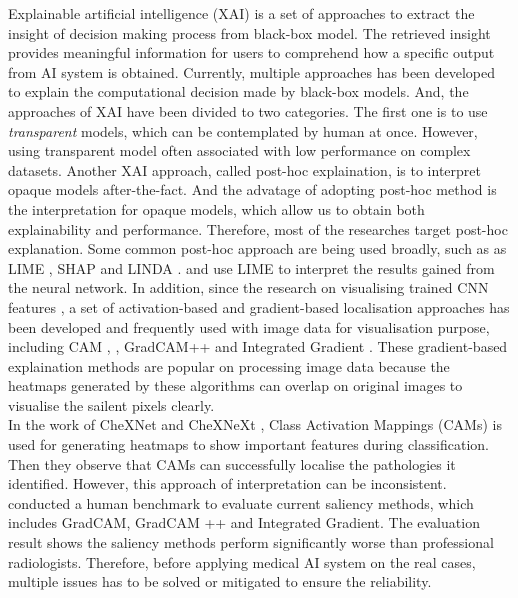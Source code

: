 Explainable artificial intelligence (XAI) is a set of approaches to extract the insight of decision making process from black-box model. The retrieved insight provides meaningful information for users to comprehend how a specific output from AI system is obtained. Currently, multiple approaches has been developed to explain the computational decision made by black-box models. And, the approaches of XAI have been divided to two categories. The first one is to use \textit{transparent} models, which can be contemplated by human at once. However, using transparent model often associated with low performance on complex datasets. Another XAI approach, called post-hoc explaination, is to interpret opaque models after-the-fact. And the advatage of adopting post-hoc method is the interpretation for opaque models, which allow us to obtain both explainability and performance. Therefore, most of the researches target post-hoc explanation. Some common post-hoc approach are being used broadly, such as as LIME \citep{Ribeiro2016LIME}, SHAP \citep{Lundberg2017SHAP} and LINDA \citep{Moreira2021LINDA}. \citet{Ahsan2020LIMEOnCXR} and \citet{Teixeira2021LIMEAndGradCAMOnCXR} use LIME to interpret the results gained from the neural network. In addition, since the research on visualising trained CNN features \citep{Zeiler2014UnderstandCNN} \citep{Simonyan14DeepInside}, a set of activation-based and gradient-based localisation approaches has been developed and frequently used with image data for visualisation purpose, including CAM \citep{Zhou2015CAM}, \citep{Selvaraju2017GradCAM}, GradCAM++ \citep{Chattopadhay2018GradCAM++} and Integrated Gradient \citep{Sundararajan2017IntegratedGradient}. These gradient-based explaination methods are popular on processing image data because the heatmaps generated by these algorithms can overlap on original images to visualise the sailent pixels clearly. \\


In the work of CheXNet \citep{Rajpurkar2017CheXNet} and CheXNeXt \citep{Rajpurkar2018CheXNeXt}, Class Activation Mappings (CAMs) \citep{Zhou2015CAM} is used for generating heatmaps to show important features during classification. Then they observe that CAMs can successfully localise the pathologies it identified. However, this approach of interpretation can be inconsistent. \citet{Saporta2021BechmarkingSaliencyMethods} conducted a human benchmark to evaluate current saliency methods, which includes GradCAM, GradCAM ++ and Integrated Gradient. The evaluation result shows the saliency methods perform significantly worse than professional radiologists. Therefore, before applying medical AI system on the real cases, multiple issues has to be solved or mitigated to ensure the reliability. \\

